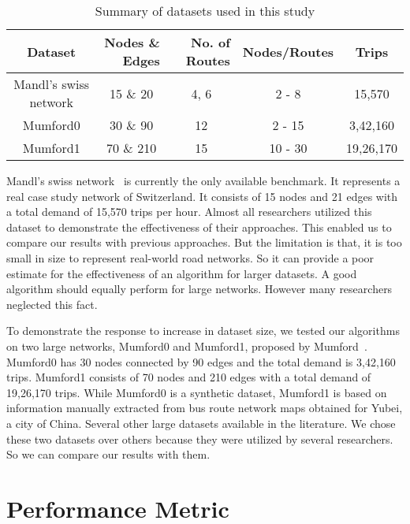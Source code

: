 \begin{table}[!htbp]
	\centering
	\caption{Summary of datasets used in this study}
	\begin{tabular}{|c|r|r|r|c|}
		\hline
		Dataset & Nodes \& Edges & No. of Routes & Nodes/Routes & Trips\\
		\hline
		Mandl's swiss network & \multicolumn{1}{c|}{15 \& 20} & \multicolumn{1}{c|}{4, 6} & \multicolumn{1}{c|}{2 - 8} & 15,570 \\
		\hline
		Mumford0 & \multicolumn{1}{c|}{30 \& 90 } & \multicolumn{1}{c|}{12} & \multicolumn{1}{c|}{2 - 15} & 3,42,160 \\
		\hline
		Mumford1 & \multicolumn{1}{c|}{70 \& 210} & \multicolumn{1}{c|}{15} & \multicolumn{1}{c|}{10 - 30} & 19,26,170 \\
		\hline
	\end{tabular}%
	\label{tab:sum_datasets}%
\end{table}%

Mandl's swiss network~\cite{mandl1980evaluation} is currently the only available benchmark. It represents a real case study network of Switzerland. It consists of 15 nodes and 21 edges with a total demand of 15,570 trips per hour. Almost all researchers utilized this dataset to demonstrate the effectiveness of their approaches. This enabled us to compare our results with previous approaches. But the limitation is that, it is too small in size to represent real-world road networks. So it can provide a poor estimate for the effectiveness of an algorithm for larger datasets. A good algorithm should equally perform for large networks. However many researchers neglected this fact. 

To demonstrate the response to increase in dataset size, we tested our algorithms on two large networks, Mumford0 and Mumford1, proposed by Mumford~\cite{mumford2013new}. Mumford0 has 30 nodes connected by 90 edges and the total demand is 3,42,160 trips. Mumford1 consists of 70 nodes and 210 edges with a total demand of 19,26,170 trips. While Mumford0 is a synthetic dataset, Mumford1 is based on information manually extracted from bus route network maps obtained for Yubei, a city of China. Several other large datasets available in the literature. We chose these two datasets over others because they were utilized by several researchers. So we can compare our results with them.

\section{Performance Metric}\label{sec:pMes}

